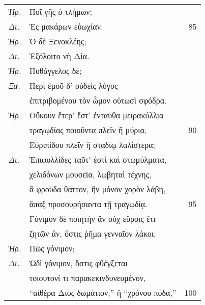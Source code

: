 \documentclass[13pt]{article}
\begin{document}
\begin{greek}
\begin{multicols}{2}
\begin{parcolumns}[colwidths={1=1.5em, 2=0.9\linewidth}]{2}
\end{parcolumns}
\end{multicols}

\newpage

\begin{spacing}{1.5}

\begin{tabularx}{\textwidth}{@{}lXr@{}}
  \textit{Ἡρ.} & Ποῖ γῆς ὁ τλήμων; & \\
  \textit{Δι.} & \hspace*{8em}Ἐς μακάρων εὐωχίαν. & 85 \\
  \textit{Ἡρ.} & Ὁ δὲ Ξενοκλέης; & \\
  \textit{Δι.} & \hspace*{7em}Ἐξόλοιτο νὴ Δία. & \\
  \textit{Ἡρ.} & Πυθάγγελος δέ; & \\
  \textit{Ξα.} & \hspace*{7em}Περὶ ἐμοῦ δ' οὐδεὶς λόγος & \\
  & ἐπιτριβομένου τὸν ὦμον οὑτωσὶ σφόδρα. & \\
  \textit{Ἡρ.} & Οὔκουν ἕτερ' ἔστ' ἐνταῦθα μειρακύλλια & \\
  & τραγῳδίας ποιοῦντα πλεῖν ἢ μύρια, & 90 \\
  & Εὐριπίδου πλεῖν ἢ σταδίῳ λαλίστερα; & \\
  \textit{Δι.} & Ἐπιφυλλίδες ταῦτ' ἐστὶ καὶ στωμύλματα, & \\
  & χελιδόνων μουσεῖα, λωβηταὶ τέχνης, & \\
  & ἃ φροῦδα θᾶττον, ἢν μόνον χορὸν λάβῃ, & \\
  & ἅπαξ προσουρήσαντα τῇ τραγῳδίᾳ. & 95 \\
  & Γόνιμον δὲ ποιητὴν ἂν οὐχ εὕροις ἔτι & \\
  & ζητῶν ἄν, ὅστις ῥῆμα γενναῖον λάκοι. & \\
  \textit{Ἡρ.} & Πῶς γόνιμον; & \\
  \textit{Δι.} & \hspace*{6em}Ὡδὶ γόνιμον, ὅστις φθέγξεται & \\
  & τοιουτονί τι παρακεκινδυνευμένον, & \\
  & “αἰθέρα Διὸς δωμάτιον,” ἢ “χρόνου πόδα,” & 100 \\

\end{tabularx}

\end{spacing}

\newpage


\end{greek}
\end{document}
